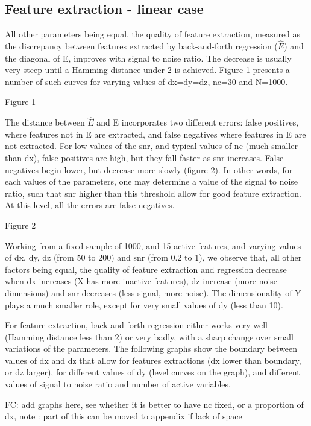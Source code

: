 \documentclass{article}
\begin{document}
\subsection{Feature extraction - linear case}
All other parameters being equal, the quality of feature extraction, measured as the discrepancy between features extracted by back-and-forth regression ($\hat E$) and the diagonal of E, improves with signal to noise ratio.
%
The decrease is usually very steep until a Hamming distance under 2 is achieved.
%
Figure 1 presents a number of such curves for varying values of dx=dy=dz, nc=30 and N=1000.

Figure 1

The distance between $\hat E$ and E incorporates two different errors: false positives, where features not in E are extracted, and false negatives where features in E are not extracted.
%
For low values of the snr, and typical values of nc (much smaller than dx), false positives are high, but they fall faster as snr increases.
%
False negatives begin lower, but decrease more slowly (figure 2).
%
In other words, for each values of the parameters, one may determine a value of the signal to noise ratio, such that snr higher than this threshold allow for good feature extraction.
%
At this level, all the errors are false negatives.

Figure 2

Working from a fixed sample of 1000, and 15 active features, and varying values of dx, dy, dz (from 50 to 200) and snr (from 0.2 to 1), we observe that, all other factors being equal, the quality of feature extraction and regression decrease when dx increases (X has more inactive features), dz increase (more noise dimensions) and snr decreases (less signal, more noise).
%
The dimensionality of Y plays a much smaller role, except for very small values of dy (less than 10).

For feature extraction, back-and-forth regression either works very well (Hamming distance less than 2) or very badly, with a sharp change over small variations of the parameters.
%
The following graphs show the boundary between values of dx and dz that allow for features extractions (dx lower than boundary, or dz larger), for different values of dy (level curves on the graph), and different values of signal to noise ratio and number of active variables.

FC: add graphs here, see whether it is better to have nc fixed, or a proportion of dx, note : part of this can be moved to appendix if lack of space
\end{document}
